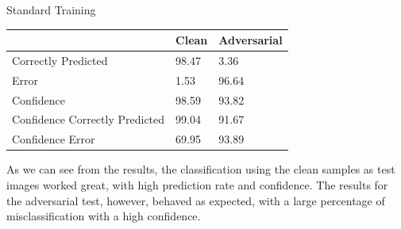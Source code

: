 \begin{tframe}{Standard Training}

\begin{table}[h]
\centering
\begin{tabular}{@{}lll@{}}
\toprule
                               & Clean & Adversarial \\ \midrule
Correctly Predicted            & 98.47 & 3.36        \\
Error                          & 1.53  & 96.64       \\
Confidence                     & 98.59 & 93.82       \\
Confidence Correctly Predicted & 99.04 & 91.67       \\
Confidence Error               & 69.95 & 93.89       \\ \bottomrule
\end{tabular}
\end{table}

As we can see from the results, the classification using the clean samples as test images worked great, with high prediction rate and confidence. The results for the adversarial test, however, behaved as expected, with a large percentage of misclassification with a high confidence.

\end{tframe}